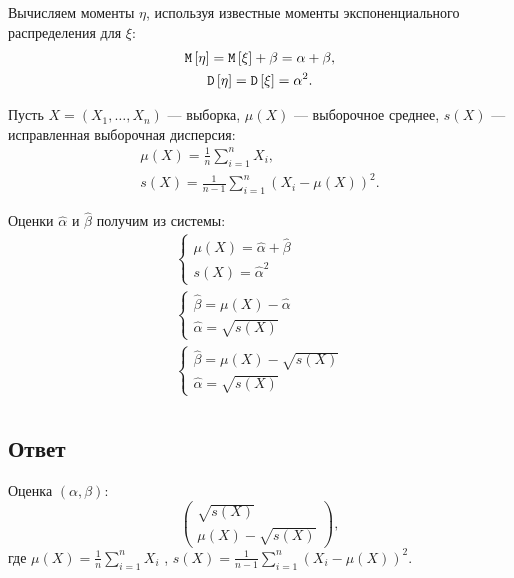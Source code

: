 Вычисляем моменты $\eta$, используя известные моменты экспоненциального распределения для $\xi$:
\begin{gather}
    \mathtt{M} \left [ \eta \right ] = \mathtt{M} \left [ \xi \right ] + \beta = \alpha + \beta , \\
    \mathtt{D} \left [ \eta \right ] = \mathtt{D} \left [ \xi \right ] = \alpha^2.
\end{gather}

Пусть $X = \left ( X_1, \dots, X_n \right )$ --- выборка, $\mu(X)$ --- выборочное среднее, $s(X)$ --- исправленная выборочная дисперсия:
\begin{gather}
    \mu(X) = \frac{1}{n} \sum_{i=1}^n X_i , \\
    s(X) = \frac{1}{n-1} \sum_{i=1}^n \left ( X_i - \mu(X) \right )^2 .
\end{gather}

Оценки $\widehat{\alpha}$ и $\widehat{\beta}$ получим из системы:
\begin{gather}
    \left \{
    \begin{array}{c}
        \mu(X) = \widehat{\alpha} + \widehat{\beta} \\
        s(X) = \widehat{\alpha}^2
    \end{array}
    \right . \\
    \left \{
    \begin{array}{c}
        \widehat{\beta} = \mu(X) - \widehat{\alpha} \\
        \widehat{\alpha} = \sqrt{s(X)}
    \end{array}
    \right . \\
    \left \{
    \begin{array}{c}
        \widehat{\beta} = \mu(X) - \sqrt{s(X)} \\
        \widehat{\alpha} = \sqrt{s(X)}
    \end{array}
    \right . \\
\end{gather}

\subsection*{Ответ}
Оценка $(\alpha, \beta)$:
\begin{equation}
    \begin{pmatrix}
        \sqrt{s(X)} \\
        \mu(X) - \sqrt{s(X)}
    \end{pmatrix} ,
\end{equation}
где $\mu(X) = \frac{1}{n} \sum_{i=1}^n X_i$ , $s(X) = \frac{1}{n-1} \sum_{i=1}^n \left ( X_i - \mu(X) \right )^2$.

